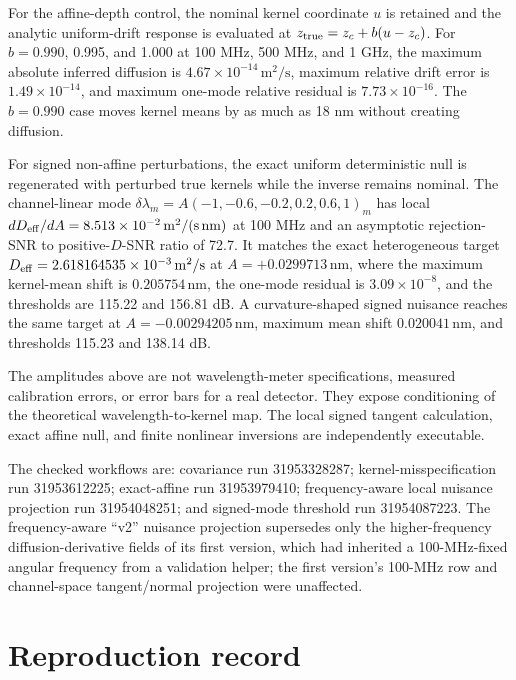 \documentclass[aps,pra,onecolumn,superscriptaddress,nofootinbib]{revtex4-2}
\begin{document}
For the affine-depth control, the nominal kernel coordinate $u$ is retained and the analytic uniform-drift response is evaluated at $z_{\rm true}=z_c+b(u-z_c)$. For $b=0.990$, 0.995, and 1.000 at 100 MHz, 500 MHz, and 1 GHz, the maximum absolute inferred diffusion is $4.67\times10^{-14}\,\mathrm{m^2/s}$, maximum relative drift error is $1.49\times10^{-14}$, and maximum one-mode relative residual is $7.73\times10^{-16}$. The $b=0.990$ case moves kernel means by as much as 18 nm without creating diffusion.

For signed non-affine perturbations, the exact uniform deterministic null is regenerated with perturbed true kernels while the inverse remains nominal. The channel-linear mode $\delta\lambda_m=A(-1,-0.6,-0.2,0.2,0.6,1)_m$ has local $dD_{\rm eff}/dA=8.513\times10^{-2}\,\mathrm{m^2/(s\,nm)}$ at 100 MHz and an asymptotic rejection-SNR to positive-$D$-SNR ratio of 72.7. It matches the exact heterogeneous target $D_{\rm eff}=2.618164535\times10^{-3}\,\mathrm{m^2/s}$ at $A=+0.0299713\,\mathrm{nm}$, where the maximum kernel-mean shift is $0.205754\,\mathrm{nm}$, the one-mode residual is $3.09\times10^{-8}$, and the thresholds are 115.22 and 156.81 dB. A curvature-shaped signed nuisance reaches the same target at $A=-0.00294205\,\mathrm{nm}$, maximum mean shift $0.020041\,\mathrm{nm}$, and thresholds 115.23 and 138.14 dB.

The amplitudes above are not wavelength-meter specifications, measured calibration errors, or error bars for a real detector. They expose conditioning of the theoretical wavelength-to-kernel map. The local signed tangent calculation, exact affine null, and finite nonlinear inversions are independently executable.

The checked workflows are: covariance run 31953328287; kernel-misspecification run 31953612225; exact-affine run 31953979410; frequency-aware local nuisance projection run 31954048251; and signed-mode threshold run 31954087223. The frequency-aware ``v2'' nuisance projection supersedes only the higher-frequency diffusion-derivative fields of its first version, which had inherited a 100-MHz-fixed angular frequency from a validation helper; the first version's 100-MHz row and channel-space tangent/normal projection were unaffected.

\section{Reproduction record}
\end{document}
